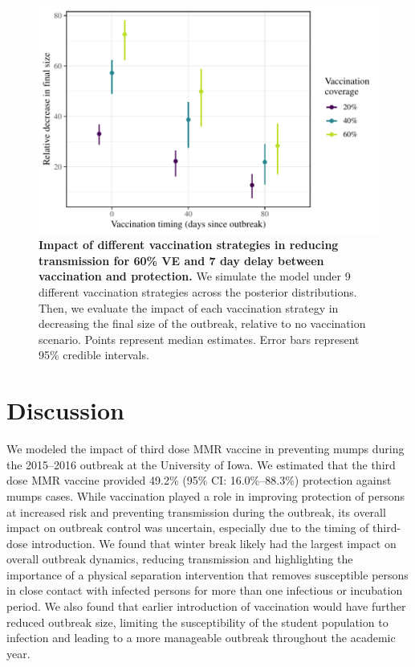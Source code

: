 \documentclass[12pt]{article}
\begin{document}
\begin{figure}[!h]
\includegraphics[width=\textwidth]{../figure_stanfit_seirv_final/figure_stanfit_strategy_summ.pdf}
\caption{
\textbf{Impact of different vaccination strategies in reducing transmission for 60\% VE and 7 day delay between vaccination and protection.}
We simulate the model under 9 different vaccination strategies across the posterior distributions.
Then, we evaluate the impact of each vaccination strategy in decreasing the final size of the outbreak, relative to no vaccination scenario.
Points represent median estimates.
Error bars represent 95\% credible intervals.
}
\label{fig:strat}
\end{figure}

\section{Discussion}

We modeled the impact of third dose MMR vaccine in preventing mumps during the 2015--2016 outbreak at the University of Iowa. 
We estimated that the third dose MMR vaccine provided 49.2\% (95\% CI: 16.0\%–88.3\%) protection against mumps cases. 
While vaccination played a role in improving protection of persons at increased risk and preventing transmission during the outbreak, its overall impact on outbreak control was uncertain, especially due to the timing of third-dose introduction. 
We found that winter break likely had the largest impact on overall outbreak dynamics, reducing transmission and highlighting the importance of a physical separation intervention that removes susceptible persons in close contact with infected persons for more than one infectious or incubation period. 
We also found that earlier introduction of vaccination would have further reduced outbreak size, limiting the susceptibility of the student population to infection and leading to a more manageable outbreak throughout the academic year. 
\end{document}
